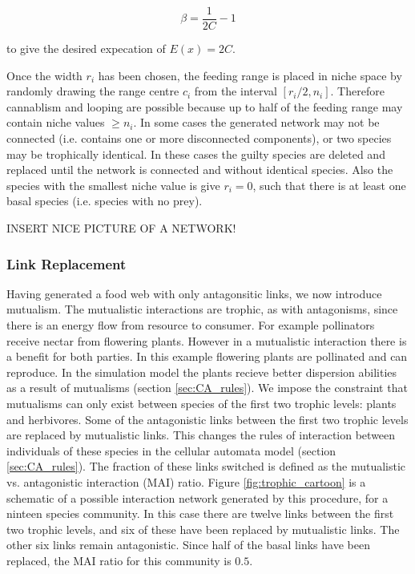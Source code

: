 \begin{equation*}
\beta = \frac{1}{2C} - 1
\label{eq:beta_value}
\end{equation*}

to give the desired expecation of $E(x) = 2C$.

Once the width $r_i$ has been chosen, the feeding range is placed in niche space by randomly drawing the range centre $c_i$ from the interval $[r_i/2, n_i]$. Therefore cannablism and looping are possible because up to half of the feeding range may contain niche values $\geq n_i$. In some cases the generated network may not be connected (i.e. contains one or more disconnected components), or two species may be trophically identical. In these cases the guilty species are deleted and replaced until the network is connected and without identical species. Also the species with the smallest niche value is give $r_i = 0$, such that there is at least one basal species (i.e. species with no prey). 

INSERT NICE PICTURE OF A NETWORK!


\subsubsection{Link Replacement}
\label{sec:link_replacement}


Having generated a food web with only antagonsitic links, we now introduce mutualism. The mutualistic interactions are trophic, as with antagonisms, since there is an energy flow from resource to consumer. For example pollinators receive nectar from flowering plants. However in a mutualistic interaction there is a benefit for both parties. In this example flowering plants are pollinated and can reproduce. In the simulation model the plants recieve better dispersion abilities as a result of mutualisms (section \ref{sec:CA_rules}). We impose the constraint that mutualisms can only exist between species of the first two trophic levels: plants and herbivores. Some of the antagonistic links between the first two trophic levels are replaced by mutualistic links. This changes the rules of interaction between individuals of these species in the cellular automata model (section \ref{sec:CA_rules}). The fraction of these links switched is defined as the mutualistic vs. antagonistic interaction (MAI) ratio. Figure \ref{fig:trophic_cartoon} is a schematic of a possible interaction network generated by this procedure, for a ninteen species community. In this case there are twelve links between the first two trophic levels, and six of these have been replaced by mutualistic links. The other six links remain antagonistic. Since half of the basal links have been replaced, the MAI ratio for this community is $0.5$.

